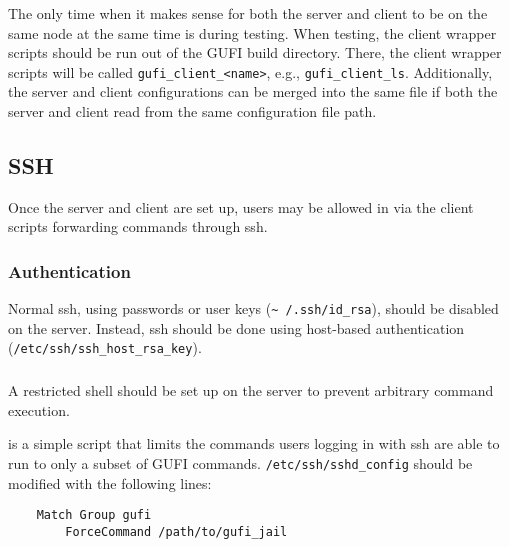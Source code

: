 The only time when it makes sense for both the server and client to be
on the same node at the same time is during testing. When testing, the
client wrapper scripts should be run out of the GUFI build
directory. There, the client wrapper scripts will be called
\texttt{gufi\_client\_<name>}, e.g.,
\texttt{gufi\_client\_ls}. Additionally, the server and client
configurations can be merged into the same file if both the server and
client read from the same configuration file path.

\subsection{SSH}
Once the server and client are set up, users may be allowed in via the
client scripts forwarding commands through ssh.

\subsubsection{Authentication}
\label{sec:hostbasedauth}
Normal ssh, using passwords or user keys (\texttt{\textasciitilde
  /.ssh/id\_rsa}), should be disabled on the server. Instead, ssh
should be done using host-based authentication
(\texttt{/etc/ssh/ssh\_host\_rsa\_key}).

\subsubsection{\gufijail}
\label{sec:gufi_jail}
A restricted shell should be set up on the server to prevent arbitrary
command execution.

\gufijail is a simple script that limits the commands users logging in
with ssh are able to run to only a subset of GUFI
commands. \texttt{/etc/ssh/sshd\_config} should be modified with the
following lines:

\begin{verbatim}
    Match Group gufi
        ForceCommand /path/to/gufi_jail
\end{verbatim}
